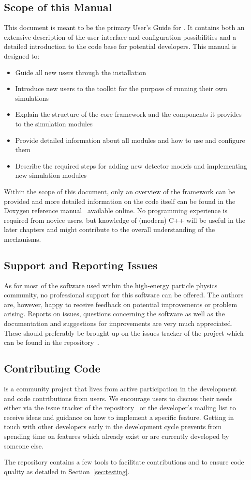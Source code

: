 \subsection{Scope of this Manual}
This document is meant to be the primary User's Guide for \apsq.
It contains both an extensive description of the user interface and configuration possibilities and a detailed introduction to the code base for potential developers.
This manual is designed to:
\begin{itemize}
\item Guide all new users through the installation
\item Introduce new users to the toolkit for the purpose of running their own simulations
\item Explain the structure of the core framework and the components it provides to the simulation modules
\item Provide detailed information about all modules and how to use and configure them
\item Describe the required steps for adding new detector models and implementing new simulation modules
\end{itemize}

Within the scope of this document, only an overview of the framework can be provided and more detailed information on the code itself can be found in the Doxygen reference manual~\cite{ap2-doxygen} available online.
No programming experience is required from novice users, but knowledge of (modern) C++ will be useful in the later chapters and might contribute to the overall understanding of the mechanisms.

\subsection{Support and Reporting Issues}
As for most of the software used within the high-energy particle physics community, no professional support for this software can be offered.
The authors are, however, happy to receive feedback on potential improvements or problem arising.
Reports on issues, questions concerning the software as well as the documentation and suggestions for improvements are very much appreciated.
These should preferably be brought up on the issues tracker of the project which can be found in the repository~\cite{ap2-issue-tracker}.


\subsection{Contributing Code}
\apsq is a community project that lives from active participation in the development and code contributions from users.
We encourage users to discuss their needs either via the issue tracker of the repository~\cite{ap2-issue-tracker} or the developer's mailing list to receive ideas and guidance on how to implement a specific feature.
Getting in touch with other developers early in the development cycle prevents from spending time on features which already exist or are currently developed by someone else.

The repository contains a few tools to facilitate contributions and to ensure code quality as detailed in Section~\ref{sec:testing}.
